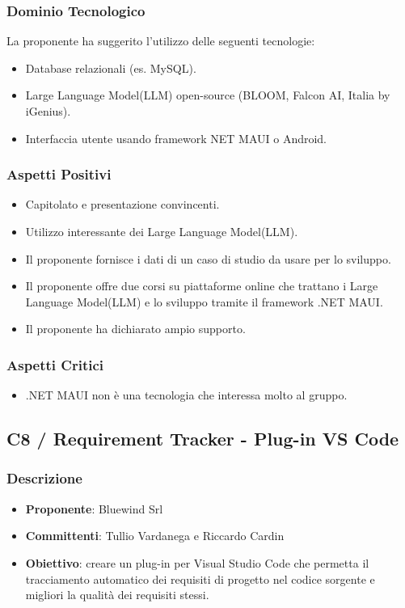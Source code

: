 \documentclass[a4paper, 12pt]{article}
\begin{document}
\subsubsection{Dominio Tecnologico}
La proponente ha suggerito l’utilizzo delle seguenti tecnologie:
\begin{itemize}
    \item Database relazionali (es. MySQL).
    \item Large Language Model(LLM) open-source (BLOOM, Falcon AI, Italia by iGenius).
    \item Interfaccia utente usando framework NET MAUI o Android.
\end{itemize}

\subsubsection{Aspetti Positivi}
\begin{itemize}
    \item Capitolato e presentazione convincenti.
    \item Utilizzo interessante dei Large Language Model(LLM).
    \item Il proponente fornisce i dati di un caso di studio da usare per lo sviluppo.
    \item Il proponente offre due corsi su piattaforme online che trattano i Large Language Model(LLM) e lo sviluppo tramite il framework .NET MAUI.
    \item Il proponente ha dichiarato ampio supporto.
\end{itemize}

\subsubsection{Aspetti Critici}
\begin{itemize}
    \item .NET MAUI non è una tecnologia che interessa molto al gruppo.
\end{itemize}

\subsection{C8 / Requirement Tracker - Plug-in VS Code}
\subsubsection{Descrizione}
\begin{itemize}
    \item \textbf{Proponente}: Bluewind Srl
    \item \textbf{Committenti}: Tullio Vardanega e Riccardo Cardin
    \item \textbf{Obiettivo}: creare un plug-in per Visual Studio Code che permetta il tracciamento automatico dei requisiti di progetto nel codice sorgente e migliori la qualità dei requisiti stessi.
\end{itemize}
\end{document}
